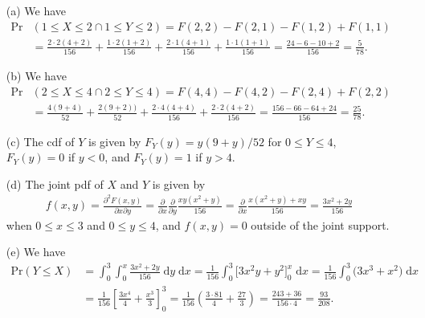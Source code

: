 \documentclass[10pt]{article}
\begin{document}
\begin{itemize}
    \item[(a)] We have 
    \begin{align*}
        \mathrm{Pr}&(1 \le X \le 2 \cap 1 \le Y \le 2)
        = F(2,2) - F(2,1) - F(1,2) + F(1,1) \\
        &= \frac{2 \cdot 2 (4 + 2)}{156} + \frac{1 \cdot 2 (1 + 2)}{156} + \frac{2 \cdot 1 (4 + 1)}{156} + \frac{1 \cdot 1 (1 + 1)}{156}
        = \frac{24 - 6 - 10 + 2}{156}
        = \frac{5}{78}.
    \end{align*}
    \item[(b)] We have 
    \begin{align*}
        \mathrm{Pr}&(2 \le X \le 4 \cap 2 \le Y \le 4) 
        = F(4,4) - F(4,2) - F(2,4) + F(2,2) \\
        &= \frac{4 (9 + 4)}{52} + \frac{2 (9 + 2))}{52} + \frac{2 \cdot 4 (4 + 4)}{156} + \frac{2 \cdot 2 (4 + 2)}{156}
        = \frac{156 - 66 - 64 + 24}{156}
        = \frac{25}{78}.
    \end{align*}
    \item[(c)] The cdf of \(Y\) is given by \(F_Y(y) = y(9 + y)/52\) for \(0 \le Y \le 4\), \(F_Y(y) = 0\) if \(y < 0\), and \(F_Y(y) = 1\) if \(y > 4\).
    \item[(d)] The joint pdf of \(X\) and \(Y\) is given by 
    \begin{align*}
        f(x,y) = \frac{\partial^2 F(x,y)}{\partial x \partial y} 
        = \frac{\partial}{\partial x} \frac{\partial}{\partial y} \frac{xy(x^2 + y)}{156} 
        = \frac{\partial}{\partial x} \frac{x(x^2 + y) + xy}{156}
        = \frac{3x^2 + 2y}{156}
    \end{align*}
    when \(0 \le x \le 3\) and \(0 \le y \le 4\), and \(f(x,y) = 0\) outside of the joint support. 
    \item[(e)] We have 
    \begin{align*}
        \mathrm{Pr}(Y \le X)
        &= \int_0^3 \int_0^x \frac{3x^2 + 2y}{156} \;\mathrm{d}y \;\mathrm{d}x
        = \frac{1}{156} \int_0^3 \big[ 3 x^2 y + y^2 \big]_0^x \;\mathrm{d}x 
        = \frac{1}{156} \int_0^3 \big( 3x^3 + x^2 \big) \;\mathrm{d}x \\
        &= \frac{1}{156} \left[ \frac{3x^4}{4} + \frac{x^3}{3} \right]_0^3
        = \frac{1}{156} \left( \frac{3 \cdot 81}{4} + \frac{27}{3} \right)
        = \frac{243 + 36}{156 \cdot 4} 
        = \frac{93}{208}.
    \end{align*}
\end{itemize}
\end{document}
